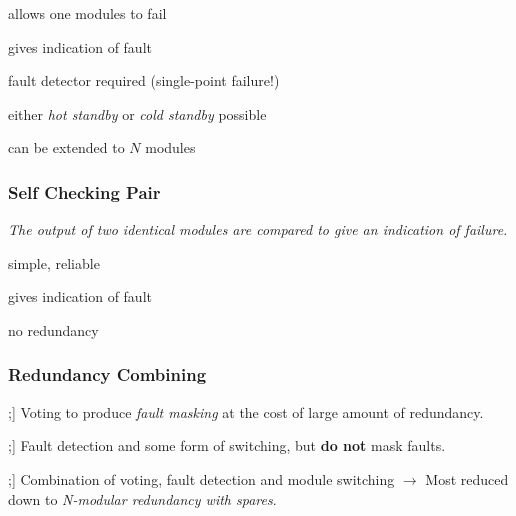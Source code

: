 \documentclass[
  10pt,
  a4paper,
  twocolumn]{article}
\DeclareRobustCommand{\textHighlight}[1]{\tikz[baseline]{\node[anchor=base,fill=Gray!10, rounded corners=5pt, draw, densely dotted] {\bfseries{#1}};}}
\begin{document}
{\small\begin{description}[parsep=0mm,labelsep=2pt,labelwidth=10pt]
  \item[\color{OliveGreen}\faPlus] allows one modules to fail
  \item[\color{OliveGreen}\faPlus] gives indication of fault
  \item[\color{BrickRed}\faMinus] fault detector required (single-point failure!)
  \item[\color{Orange}\bfseries ±] either \textit{hot standby} or \textit{cold standby} possible
  \item[\color{Orange}\bfseries ±] can be extended to $N$ modules
\end{description}}

\subsubsection{Self Checking Pair}\label{self-checking-pair}

{\small\textit{The output of two identical modules are compared to give an indication of failure.}}

\begin{center}

\end{center}

{\small\begin{description}[parsep=0mm,labelsep=2pt,labelwidth=10pt]
  \item[\color{OliveGreen}\faPlus] simple, reliable
  \item[\color{OliveGreen}\faPlus] gives indication of fault
  \item[\color{BrickRed}\faMinus] no redundancy
\end{description}}

\subsubsection{Redundancy Combining}\label{redundancy-combining}

{\small\begin{description}[style=sameline,parsep=0mm,labelsep=2pt,labelwidth=10pt]
  \item[\textHighlight{\bfseries S{\fontsize{6.5pt}{7pt}\selectfont{TATIC}}}] Voting to produce \textit{fault masking} at the cost of large amount of redundancy.
  \item[\textHighlight{\bfseries D{\fontsize{6.5pt}{7pt}\selectfont{YNAMIC}}}] Fault detection and some form of switching, but \textbf{do not} mask faults.
  \item[\textHighlight{\bfseries H{\fontsize{6.5pt}{7pt}\selectfont{YBRID}}}] Combination of voting, fault detection and module switching $\rightarrow$ Most reduced down to \textit{N-modular redundancy with spares}.
\end{description}}
\end{document}
